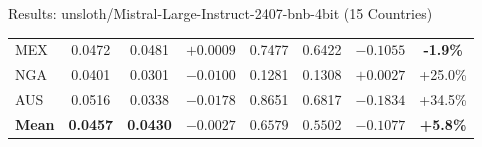 \documentclass[11pt, aspectratio=169]{beamer}
\begin{document}
\begin{frame}{Results: unsloth/Mistral-Large-Instruct-2407-bnb-4bit (15 Countries)}
\begin{table}
\begin{tabular}{@{}l cc c cc c c@{}}
\rowcolor{lightgray}
MEX & 0.0472 & 0.0481 & \textcolor{alertred}{$+0.0009$} & 0.7477 & 0.6422 & \textcolor{alertred}{$-0.1055$} & \textcolor{alertred}{\textbf{-1.9\%}} \\
NGA & 0.0401 & 0.0301 & $-0.0100$ & 0.1281 & 0.1308 & $+0.0027$ & \textcolor{cbGreen}{+25.0\%} \\
AUS & 0.0516 & 0.0338 & $-0.0178$ & 0.8651 & 0.6817 & \textcolor{alertred}{$-0.1834$} & \textcolor{cbGreen}{+34.5\%} \\
\midrule
\textbf{Mean} & \textbf{0.0457} & \textbf{0.0430} & $\mathbf{-0.0027}$ & $\mathbf{0.6579}$ & $\mathbf{0.5502}$ & \textcolor{alertred}{$\mathbf{-0.1077}$} & \textcolor{cbGreen}{\textbf{+5.8\%}} \\
\bottomrule
\end{tabular}
\end{table}

\end{frame}
\end{document}
